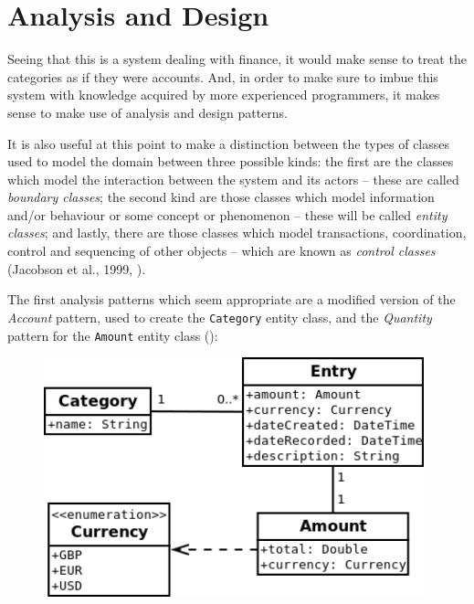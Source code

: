 \section{Analysis and Design} \label{sec:Design}

Seeing that this is a system dealing with finance, it would make sense to treat
the categories as if they were accounts. And, in order to make sure to imbue
this system with knowledge acquired by more experienced programmers, it makes
sense to make use of analysis and design patterns.

It is also useful at this point to make a distinction between the types of
classes used to model the domain between three possible kinds: the first are
the classes which model the interaction between the system and its actors --
these are called \emph{boundary classes}; the second kind are those classes
which model information and/or behaviour or some concept or phenomenon -- these
will be called \emph{entity classes}; and lastly, there are those classes which
model transactions, coordination, control and sequencing of other objects --
which are known as \emph{control classes} (Jacobson et al., 1999,
\cite[cited][pp.~198-201]{bennett2010object}).

The first analysis patterns which seem appropriate are a modified version of
the \emph{Account} pattern, used to create the \texttt{Category} entity class,
and the \emph{Quantity} pattern for the \texttt{Amount} entity class
(\cite[][Sections~6.1~\&~3.1]{fowler1997analysis}):
\begin{figure}[ht!]
  \begin{center}
    \includegraphics[width=11cm]{./contents/img/Class_Diagram_-_Categories_and_Amount.png}
  \end{center}
  \caption{}
  \label{fig:ClassDiagram.CategoriesAndAmount}
\end{figure}
\FloatBarrier

